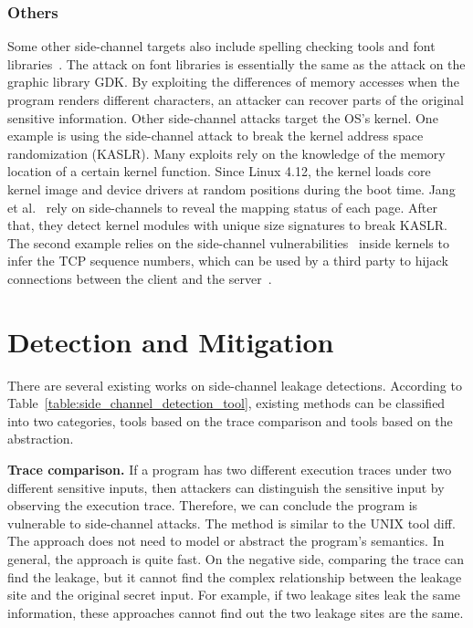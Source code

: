 \subsubsection*{Others}
Some other side-channel targets also include spelling checking tools and font libraries~\cite{xu2015controlled}. The attack on font libraries is essentially the same as the attack on the graphic library GDK. By exploiting the differences of memory accesses when the program renders different characters, an attacker can recover parts of the original sensitive information. Other side-channel attacks target the OS's kernel. One example is using the side-channel attack to break the kernel address space randomization (KASLR).
Many exploits rely on the knowledge of the memory location of a certain kernel function. Since Linux 4.12, the kernel loads core kernel image and device drivers at random positions during the boot time. Jang et al.~\cite{jang2016breaking} rely on side-channels to reveal the mapping status of each page. After that, they detect kernel modules with unique size signatures to break KASLR. The second example relies on the side-channel vulnerabilities~\cite{cao2019principled} inside kernels to infer the TCP sequence numbers, which can be used by a third party to hijack connections between the client and the server~\cite{cao2016off}.

\section{Detection and Mitigation}
There are several existing works on side-channel leakage detections. According to Table~\ref{table:side_channel_detection_tool}, existing methods can be classified into two categories, tools based on the trace comparison and tools based on the abstraction.

\textbf{Trace comparison.} If a program has two different execution traces under two different sensitive inputs, then attackers can distinguish the sensitive input by observing the execution trace. Therefore, we can conclude the program is vulnerable to side-channel attacks. The method is similar to the UNIX tool \textsf{diff}.  The approach does not need to model or abstract the program's semantics. In general, the approach is quite fast. On the negative side, comparing the trace can find the leakage, but it cannot find the complex relationship between the leakage site and the original secret input. For example, if two leakage sites leak the same information, these approaches cannot find out the two leakage sites are the same.

